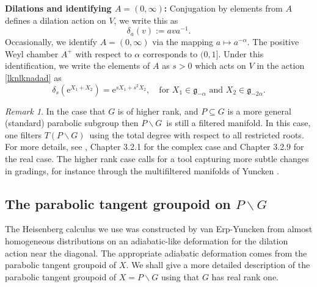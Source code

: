 \documentclass[a4paper,reqno]{amsart}
\numberwithin{equation}{section}
\theoremstyle{definition}
\theoremstyle{remark}
\newtheorem{remark}[thm]{Remark}
\begin{document}
{\bf Dilations and identifying $A=(0,\infty)$:} Conjugation by elements from $A$ defines a dilation action on $V$, we write this as 
\begin{equation}
\label{lknlknadad}
\delta_a(v):=ava^{-1}.
\end{equation}
Occasionally, we identify $A=(0,\infty)$ via the mapping $a\mapsto a^{-\alpha}$. The positive Weyl chamber $A^+$ with respect to $\alpha$ corresponds to $(0,1]$. Under this identification, we write the elements of $A$ as $s>0$ which acts on $V$ in the action \eqref{lknlknadad} as 
$$\delta_s(\mathrm{e}^{X_1+X_2})=\mathrm{e}^{sX_1+s^2X_2},\quad\mbox{for $X_1\in \mathfrak{g}_{-\alpha}$ and $X_2\in \mathfrak{g}_{-2\alpha}$.}$$

\begin{remark}
In the case that $G$ is of higher rank, and $P\subseteq G$ is a more general (standard) parabolic subgroup then $P\backslash G$ is still a filtered manifold. In this case, one filters $T(P\backslash G)$ using the total degree with respect to all restricted roots. For more details, see \cite{cap}, Chapter 3.2.1 for the complex case and Chapter 3.2.9 for the real case. The higher rank case calls for a tool capturing more subtle changes in gradings, for instance through the multifiltered manifolds of Yuncken \cite[Section 3.4]{yunckenhab}.
\end{remark}


\subsection{The parabolic tangent groupoid on $P\backslash G$}
\label{subsecparatang}
The Heisenberg calculus we use was constructed by van Erp-Yuncken \cite{vanerpyunck} from almost homogeneous distributions on an adiabatic-like deformation for the dilation action near the diagonal. The appropriate adiabatic deformation comes from the parabolic tangent groupoid of $X$. We shall give a more detailed description of the parabolic tangent groupoid of $X=P\backslash G$ using that $G$ has real rank one.
\end{document}
